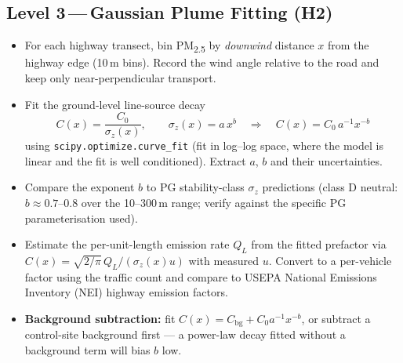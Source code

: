 \documentclass[11pt, letterpaper]{article}
\begin{document}
\subsection{Level 3\,---\,Gaussian Plume Fitting (H2)}
\begin{itemize}
  \item For each highway transect, bin PM\textsubscript{2.5} by \emph{downwind} distance $x$ from the highway edge (10\,m bins). Record the wind angle relative to the road and keep only near-perpendicular transport.
  \item Fit the ground-level line-source decay
  \[
    C(x) = \frac{C_0}{\sigma_z(x)}, \qquad \sigma_z(x) = a\,x^{b}
    \quad\Longrightarrow\quad C(x) = C_0\,a^{-1} x^{-b}
  \]
  using \texttt{scipy.optimize.curve\_fit} (fit in log--log space, where the model is linear and the fit is well conditioned). Extract $a$, $b$ and their uncertainties.
  \item Compare the exponent $b$ to PG stability-class $\sigma_z$ predictions (class D neutral: $b \approx 0.7$--$0.8$ over the 10--300\,m range; verify against the specific PG parameterisation used).
  \item Estimate the per-unit-length emission rate $Q_L$ from the fitted prefactor via $C(x) = \sqrt{2/\pi}\,Q_L/(\sigma_z(x)u)$ with measured $u$. Convert to a per-vehicle factor using the traffic count and compare to USEPA National Emissions Inventory (NEI) highway emission factors.
  \item \textbf{Background subtraction:} fit $C(x) = C_\mathrm{bg} + C_0 a^{-1}x^{-b}$, or subtract a control-site background first --- a power-law decay fitted without a background term will bias $b$ low.
\end{itemize}
\end{document}
